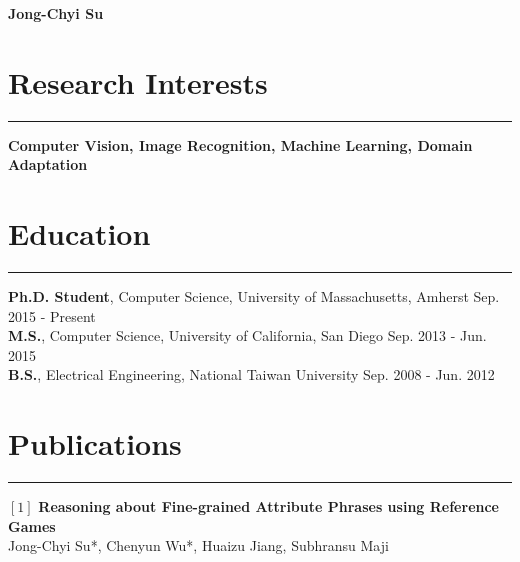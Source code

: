 \documentclass[10pt,letterpaper]{article}
\begin{document}
\thispagestyle{plain}
\begin{minipage}{0.60\textwidth}
\vspace{-20pt}
  \flushleft
{\bfseries\Huge Jong-Chyi Su}
\vspace{-0.8em}
\end{minipage}
\hfill
\begin{minipage}[ht]{0.38\textwidth}
\vspace{-5pt}
\end{minipage}
\vspace{-0pt}
\section*{Research Interests}\vspace{-5pt}
\hrule \vspace{10pt}
\textbf{Computer Vision, Image Recognition, Machine Learning, Domain Adaptation}

\section*{Education}\vspace{-5pt}
\hrule \vspace{10pt}
\textbf{Ph.D. Student}, Computer Science, University of Massachusetts, Amherst \hfill Sep. 2015 - Present\vspace{2pt}\\
\textbf{M.S.}, Computer Science, University of California, San Diego \hfill Sep. 2013 - Jun. 2015\vspace{2pt}\\
\textbf{B.S.}, Electrical Engineering, National Taiwan University \hfill Sep. 2008 - Jun. 2012

\setlength\parindent{14pt}
\section*{Publications} \vspace{-5pt}

\hrule \vspace{10pt}
$[1]$ {\bf Reasoning about Fine-grained Attribute Phrases using Reference Games}\\
\indent Jong-Chyi Su*, Chenyun Wu*, Huaizu Jiang, Subhransu Maji \\
\end{document}

